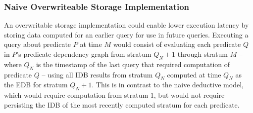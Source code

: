 
\subsubsection{Naive Overwriteable Storage Implementation}

An overwritable storage implementation could enable lower execution latency by
storing data computed for an earlier query for use in future queries.
Executing a query about predicate $P$ at time $M$ would consist of evaluating
each predicate $Q$ in $P$'s predicate dependency graph from stratum $Q_N+1$
through stratum $M$ -- where $Q_N$ is the timestamp of the last query that
required computation of predicate $Q$ -- using all IDB results from stratum
$Q_N$ computed at time $Q_N$ as the EDB for stratum $Q_N+1$.    This is in contrast to the naive deductive model, which would
require computation from stratum 1, but would not require persisting the IDB 
of the most recently computed stratum for each predicate. 


